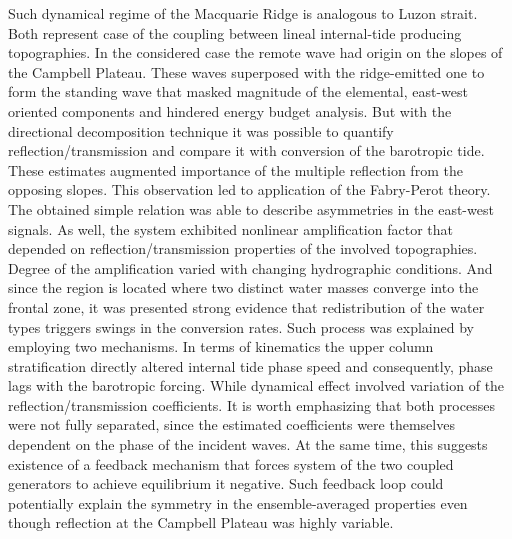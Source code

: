 \documentclass[12pt]{article}
\begin{document}
Such dynamical regime of the Macquarie Ridge is analogous to Luzon strait. Both represent case of 
the coupling between lineal internal-tide producing topographies. In the considered 
case the 
remote wave had origin on the slopes of the Campbell Plateau. These waves superposed with the 
ridge-emitted one to form the standing wave that masked magnitude of the elemental, east-west 
oriented components and hindered energy budget analysis. But with the directional decomposition 
technique it was possible to quantify reflection/transmission and compare it with conversion of 
the barotropic tide. These estimates augmented importance of the multiple reflection from the 
opposing slopes. This observation led to application of the Fabry-Perot theory. The obtained simple 
relation was able to describe asymmetries in the east-west signals. As well, the system exhibited 
nonlinear amplification factor that depended on reflection/transmission properties of the involved 
topographies.\\

Degree of the amplification varied with changing hydrographic conditions. And 
since the region is located where two distinct water masses converge into the frontal zone, 
it was presented strong evidence that redistribution of the water types triggers swings in the 
conversion 
rates. Such process was explained by employing two mechanisms. In terms of kinematics the upper column 
stratification directly altered internal tide phase speed and consequently, phase lags with the 
barotropic forcing. While dynamical effect involved variation of the reflection/transmission 
coefficients. It is worth emphasizing that both processes were not fully separated, since the 
estimated coefficients were themselves dependent on the phase of the incident waves. At the same 
time, this suggests existence of a feedback mechanism that forces system of the two coupled 
generators to achieve equilibrium it negative. Such feedback loop could potentially explain the 
symmetry in the ensemble-averaged properties even though reflection at the Campbell Plateau was 
highly 
variable.\\
\end{document}
